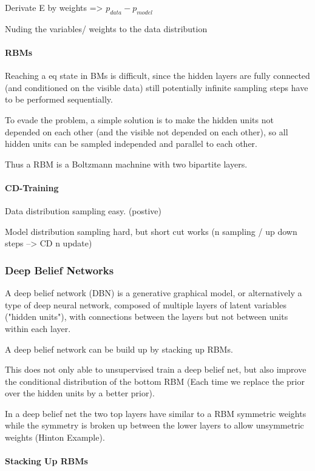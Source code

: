 Derivate E by weights => $p_{data} - p_{model}$

Nuding the variables/ weights to the data distribution 


\paragraph{RBMs}

Reaching a eq state in BMs is difficult, since the hidden layers are fully connected (and conditioned on the visible data) still potentially infinite sampling steps have to be performed sequentially.

To evade the problem, a simple solution is to make the hidden units not depended on each other (and the visible not depended on each other), so all hidden units can be sampled independed and parallel to each other.

Thus a RBM is a Boltzmann machnine with two bipartite layers.

\paragraph{CD-Training}

Data distribution sampling easy. (postive)

Model distribution sampling hard, but short cut works (n sampling / up down steps --> CD n update) 

\subsubsection{Deep Belief Networks}

A deep belief network (DBN) is a generative graphical model, or alternatively a type of deep neural network, composed of multiple layers of latent variables ("hidden units"), with connections between the layers but not between units within each layer.

A deep belief network can be build up by stacking up RBMs.

This does not only able to unsupervised train a deep belief net, but also improve the conditional distribution of the bottom RBM (Each time we replace the prior over the hidden units by a better
prior).

In a deep belief net the two top layers have similar to a RBM symmetric weights while the symmetry is broken up between the lower layers to allow unsymmetric weights (Hinton Example).   

\paragraph{Stacking Up RBMs}

